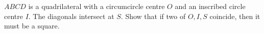 $ABCD$ is a quadrilateral with a circumcircle centre $O$ and an inscribed circle centre $I$. The diagonals intersect at $S$. Show that if two of $O,I,S$  coincide, then it must be a square.